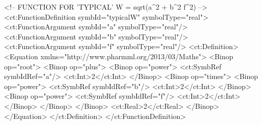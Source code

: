 \documentclass[a4paper,10pt]{article}
\begin{document}
\begin{xmlcode}
<!-- FUNCTION FOR 'TYPICAL' W = sqrt(a^2 + b^2 f^2) -->
<ct:FunctionDefinition symbId="typicalW" symbolType="real">
    <ct:FunctionArgument symbId="a" symbolType="real"/>
    <ct:FunctionArgument symbId="b" symbolType="real"/>
    <ct:FunctionArgument symbId="f" symbolType="real"/>
    <ct:Definition> 
        <Equation xmlns="http://www.pharmml.org/2013/03/Maths">
            <Binop op="root">
                <Binop op="plus">
                    <Binop op="power">
                        <ct:SymbRef symbIdRef="a"/>
                        <ct:Int>2</ct:Int>
                    </Binop>
                    <Binop op="times">
                        <Binop op="power">
                            <ct:SymbRef symbIdRef="b"/>
                            <ct:Int>2</ct:Int>
                        </Binop>
                        <Binop op="power">
                            <ct:SymbRef symbIdRef="f"/>
                            <ct:Int>2</ct:Int>
                        </Binop>
                    </Binop>
                </Binop>
                <ct:Real>2</ct:Real>
            </Binop>
        </Equation>
    </ct:Definition>
</ct:FunctionDefinition>



\end{xmlcode}
\end{document}
